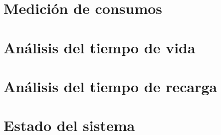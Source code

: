 
\section{Medición de consumos}
\label{sec:Medición}

\section{Análisis del tiempo de vida}
\label{sec:vida}

\section{Análisis del tiempo de recarga}
\label{sec:recarga}

\section{Estado del sistema}
\label{sec:estado}



